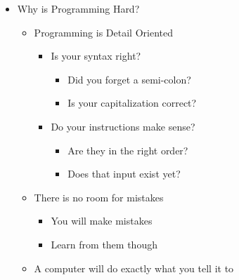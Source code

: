 \begin{itemize}

  \item Why is Programming Hard?

    \begin{itemize}

      \item Programming is Detail Oriented

        \begin{itemize}

          \item Is your syntax right?

            \begin{itemize}

              \item Did you forget a semi-colon?

              \item Is your capitalization correct?

            \end{itemize}

          \item Do your instructions make sense?

            \begin{itemize}

              \item Are they in the right order?

              \item Does that input exist yet?

            \end{itemize}

        \end{itemize}

      \item There is no room for mistakes

        \begin{itemize}

          \item You will make mistakes

          \item Learn from them though

        \end{itemize}

      \item A computer will do exactly what you tell it to

        \begin{itemize}


\end{itemize}
\end{itemize}
\end{itemize}
